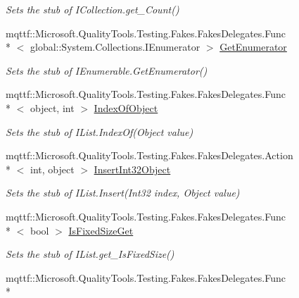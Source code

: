 \begin{DoxyCompactItemize}
\begin{DoxyCompactList}\small\item\em Sets the stub of I\-Collection.\-get\-\_\-\-Count()\end{DoxyCompactList}\item 
mqttf\-::\-Microsoft.\-Quality\-Tools.\-Testing.\-Fakes.\-Fakes\-Delegates.\-Func\\*
$<$ global\-::\-System.\-Collections.\-I\-Enumerator $>$ \hyperlink{class_system_1_1_collections_1_1_fakes_1_1_stub_i_list_acda0187574e4f59e1ec34668cd50c71e}{Get\-Enumerator}
\begin{DoxyCompactList}\small\item\em Sets the stub of I\-Enumerable.\-Get\-Enumerator()\end{DoxyCompactList}\item 
mqttf\-::\-Microsoft.\-Quality\-Tools.\-Testing.\-Fakes.\-Fakes\-Delegates.\-Func\\*
$<$ object, int $>$ \hyperlink{class_system_1_1_collections_1_1_fakes_1_1_stub_i_list_ac1a926a9db231775aef51bd452ee646e}{Index\-Of\-Object}
\begin{DoxyCompactList}\small\item\em Sets the stub of I\-List.\-Index\-Of(\-Object value)\end{DoxyCompactList}\item 
mqttf\-::\-Microsoft.\-Quality\-Tools.\-Testing.\-Fakes.\-Fakes\-Delegates.\-Action\\*
$<$ int, object $>$ \hyperlink{class_system_1_1_collections_1_1_fakes_1_1_stub_i_list_a4fb41a174f77b4717d17bc21e32163e2}{Insert\-Int32\-Object}
\begin{DoxyCompactList}\small\item\em Sets the stub of I\-List.\-Insert(\-Int32 index, Object value)\end{DoxyCompactList}\item 
mqttf\-::\-Microsoft.\-Quality\-Tools.\-Testing.\-Fakes.\-Fakes\-Delegates.\-Func\\*
$<$ bool $>$ \hyperlink{class_system_1_1_collections_1_1_fakes_1_1_stub_i_list_a3741d360b135130e9cd325932a7050db}{Is\-Fixed\-Size\-Get}
\begin{DoxyCompactList}\small\item\em Sets the stub of I\-List.\-get\-\_\-\-Is\-Fixed\-Size()\end{DoxyCompactList}\item 
mqttf\-::\-Microsoft.\-Quality\-Tools.\-Testing.\-Fakes.\-Fakes\-Delegates.\-Func\\*

\end{DoxyCompactItemize}
